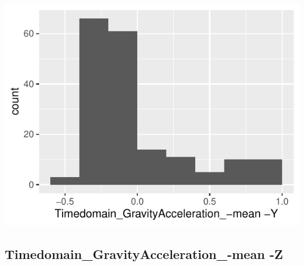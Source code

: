 \documentclass[
]{article}
\begin{document}
\begin{minipage}{0.25 \textwidth}

\includegraphics{codebook_tidydatasub_files/figure-latex/Var-10-Timedomain-GravityAcceleration--mean--Y-1.pdf}

\end{minipage}

\noindent\makebox[\linewidth]{\rule{\textwidth}{0.4pt}}

\hypertarget{timedomain_gravityacceleration_-mean--z}{%
\subsection{Timedomain\_GravityAcceleration\_-mean
-Z}\label{timedomain_gravityacceleration_-mean--z}}
\end{document}
